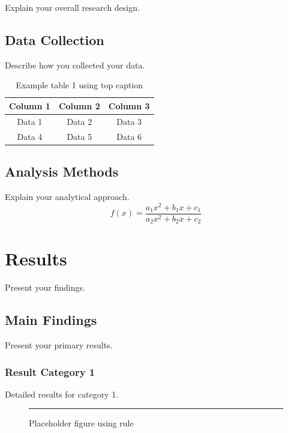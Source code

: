 Explain your overall research design.

\section{Data Collection}

Describe how you collected your data.

\begin{table}[ht]
    \caption{Example table 1 using top caption}
    \label{tab:example1}
    \centering
    \begin{tabular}{|c|c|c|}
        \hline
        Column 1 & Column 2 & Column 3 \\
        \hline
        Data 1 & Data 2 & Data 3 \\
        Data 4 & Data 5 & Data 6 \\
        \hline
    \end{tabular}
\end{table}

\section{Analysis Methods}

Explain your analytical approach.
\begin{equation}
    f(x) = \frac{a_1 x^2 + b_1 x + c_1}{a_2 x^2 + b_2 x + c_2}
\end{equation}

\chapter{Results}

Present your findings. 

\section{Main Findings}

Present your primary results.

\subsection{Result Category 1}

Detailed results for category 1. 

\begin{figure}[ht]
    \centering
    \label{fig:example1}
    \caption{Placeholder figure using rule}
    \rule{0.8\textwidth}{2in}  %
\end{figure}


